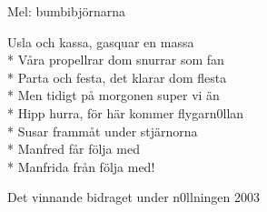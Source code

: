 \begin{SongText}
    \begin{SongInfo}
        Mel: bumbibjörnarna
    \end{SongInfo}
    \begin{SongVerse}
        Usla och kassa, gasquar en massa\\*%
        Våra propellrar dom snurrar som fan\\*%
        Parta och festa, det klarar dom flesta\\*%
        Men tidigt på morgonen super vi än\\*%
        Hipp hurra, för här kommer flygarn0llan\\*%
        Susar frammåt under stjärnorna\\*%
        Manfred får följa med\\*%
        Manfrida från följa med!
    \end{SongVerse}
    \begin{SongInfo}
        Det vinnande bidraget under n0llningen 2003
    \end{SongInfo}
\end{SongText}
